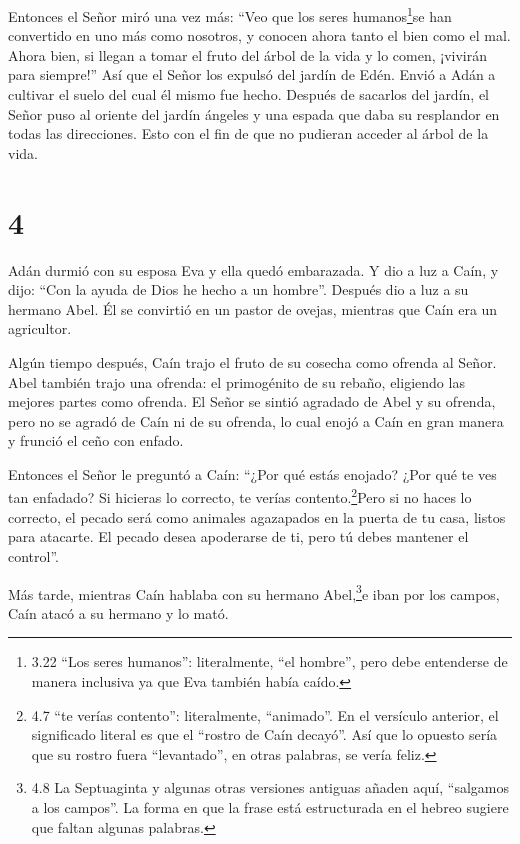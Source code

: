  Entonces el Señor miró una vez más: ``Veo que los seres
humanos\footnote{3.22 ``Los seres humanos'': literalmente, ``el
  hombre'', pero debe entenderse de manera inclusiva ya que Eva también
  había caído.}se han convertido en uno más como nosotros, y conocen
ahora tanto el bien como el mal. Ahora bien, si llegan a tomar el fruto
del árbol de la vida y lo comen, ¡vivirán para siempre!'' 
Así que el Señor los expulsó del jardín de Edén. Envió a Adán a cultivar
el suelo del cual él mismo fue hecho.  Después de sacarlos
del jardín, el Señor puso al oriente del jardín ángeles y una espada que
daba su resplandor en todas las direcciones. Esto con el fin de que no
pudieran acceder al árbol de la vida.

\hypertarget{section-3}{%
\section{4}\label{section-3}}

 Adán durmió con su esposa Eva y ella quedó embarazada. Y
dio a luz a Caín, y dijo: ``Con la ayuda de Dios he hecho a un hombre''.
 Después dio a luz a su hermano Abel. Él se convirtió en un
pastor de ovejas, mientras que Caín era un agricultor.

 Algún tiempo después, Caín trajo el fruto de su cosecha
como ofrenda al Señor.  Abel también trajo una ofrenda: el
primogénito de su rebaño, eligiendo las mejores partes como ofrenda. El
Señor se sintió agradado de Abel y su ofrenda,  pero no se
agradó de Caín ni de su ofrenda, lo cual enojó a Caín en gran manera y
frunció el ceño con enfado.

 Entonces el Señor le preguntó a Caín: ``¿Por qué estás
enojado? ¿Por qué te ves tan enfadado?  Si hicieras lo
correcto, te verías contento.\footnote{4.7 ``te verías contento'':
  literalmente, ``animado''. En el versículo anterior, el significado
  literal es que el ``rostro de Caín decayó''. Así que lo opuesto sería
  que su rostro fuera ``levantado'', en otras palabras, se vería feliz.}Pero
si no haces lo correcto, el pecado será como animales agazapados en la
puerta de tu casa, listos para atacarte. El pecado desea apoderarse de
ti, pero tú debes mantener el control''.

 Más tarde, mientras Caín hablaba con su hermano
Abel,\footnote{4.8 La Septuaginta y algunas otras versiones antiguas
  añaden aquí, ``salgamos a los campos''. La forma en que la frase está
  estructurada en el hebreo sugiere que faltan algunas palabras.}e iban
por los campos, Caín atacó a su hermano y lo mató.

